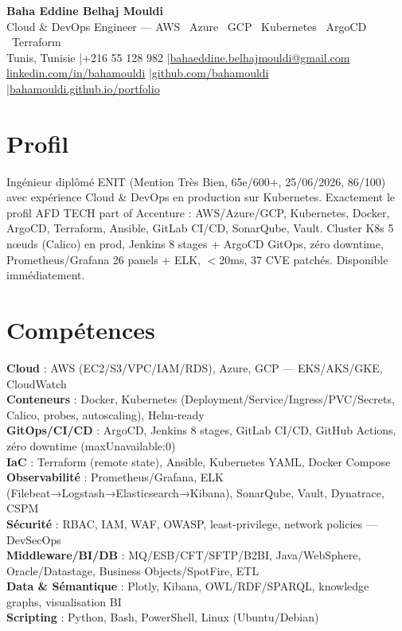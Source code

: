 \documentclass[a4paper,10pt]{article}
\begin{document}
\begin{center}
{\LARGE\bfseries\color{navy} Baha Eddine Belhaj Mouldi}\\[4pt]
{\large Cloud \& DevOps Engineer — AWS \textbar\ Azure \textbar\ GCP \textbar\ Kubernetes \textbar\ ArgoCD \textbar\ Terraform}\\[6pt]
\normalsize
Tunis, Tunisie \quad|\quad +216 55 128 982 \quad|\quad \href{mailto:bahaeddine.belhajmouldi@gmail.com}{bahaeddine.belhajmouldi@gmail.com}\\[2pt]
\href{https://www.linkedin.com/in/bahamouldi}{linkedin.com/in/bahamouldi} \quad|\quad \href{https://github.com/bahamouldi}{github.com/bahamouldi} \quad|\quad \href{https://bahamouldi.github.io/portfolio/}{bahamouldi.github.io/portfolio}
\end{center}
\vspace{4pt}

\section{Profil}
Ingénieur diplômé ENIT (Mention Très Bien, 65e/600+, 25/06/2026, 86/100) avec expérience Cloud \& DevOps en production sur Kubernetes. Exactement le profil AFD TECH part of Accenture : AWS/Azure/GCP, Kubernetes, Docker, ArgoCD, Terraform, Ansible, GitLab CI/CD, SonarQube, Vault. Cluster K8s 5 nœuds (Calico) en prod, Jenkins 8 stages + ArgoCD GitOps, zéro downtime, Prometheus/Grafana 26 panels + ELK, $<$20ms, 37 CVE patchés. Disponible immédiatement.

\section{Compétences}
\textbf{Cloud} : AWS (EC2/S3/VPC/IAM/RDS), Azure, GCP — EKS/AKS/GKE, CloudWatch\\[2pt]
\textbf{Conteneurs} : Docker, Kubernetes (Deployment/Service/Ingress/PVC/Secrets, Calico, probes, autoscaling), Helm-ready\\[2pt]
\textbf{GitOps/CI/CD} : ArgoCD, Jenkins 8 stages, GitLab CI/CD, GitHub Actions, zéro downtime (maxUnavailable:0)\\[2pt]
\textbf{IaC} : Terraform (remote state), Ansible, Kubernetes YAML, Docker Compose\\[2pt]
\textbf{Observabilité} : Prometheus/Grafana, ELK (Filebeat→Logstash→Elasticsearch→Kibana), SonarQube, Vault, Dynatrace, CSPM\\[2pt]
\textbf{Sécurité} : RBAC, IAM, WAF, OWASP, least-privilege, network policies — DevSecOps\\[2pt]
\textbf{Middleware/BI/DB} : MQ/ESB/CFT/SFTP/B2BI, Java/WebSphere, Oracle/Datastage, Business Objects/SpotFire, ETL\\[2pt]
\textbf{Data \& Sémantique} : Plotly, Kibana, OWL/RDF/SPARQL, knowledge graphs, visualisation BI\\[2pt]
\textbf{Scripting} : Python, Bash, PowerShell, Linux (Ubuntu/Debian)
\end{document}
